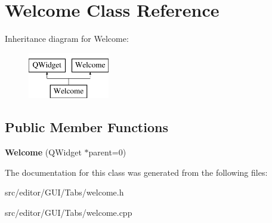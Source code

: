 \hypertarget{class_welcome}{\section{\-Welcome \-Class \-Reference}
\label{class_welcome}
}
\-Inheritance diagram for \-Welcome\-:\begin{figure}[H]
\begin{center}
\leavevmode
\includegraphics[height=2.000000cm]{class_welcome}
\end{center}
\end{figure}
\subsection*{\-Public \-Member \-Functions}
\begin{DoxyCompactItemize}
\item 
\hypertarget{class_welcome_acf62624f1107ddc68761d25febbf10ad}{{\bfseries \-Welcome} (\-Q\-Widget $\ast$parent=0)}\label{class_welcome_acf62624f1107ddc68761d25febbf10ad}

\end{DoxyCompactItemize}


\-The documentation for this class was generated from the following files\-:\begin{DoxyCompactItemize}
\item 
src/editor/\-G\-U\-I/\-Tabs/welcome.\-h\item 
src/editor/\-G\-U\-I/\-Tabs/welcome.\-cpp\end{DoxyCompactItemize}

